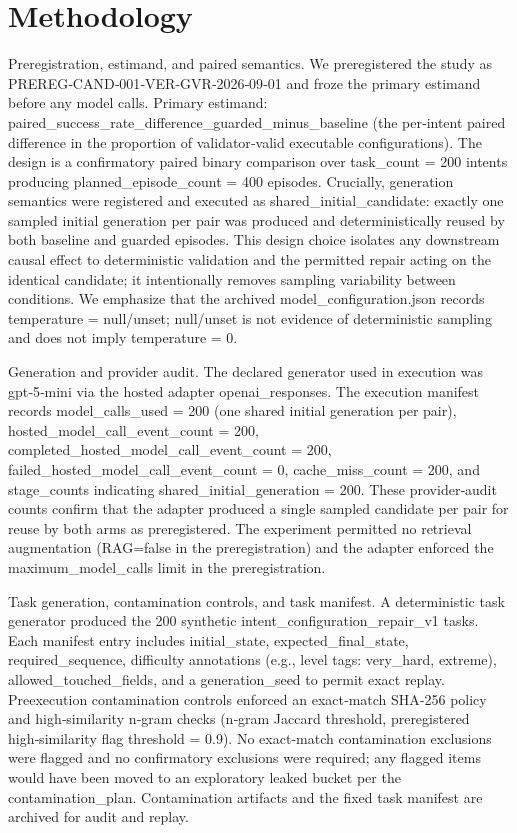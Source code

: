 \documentclass[conference]{IEEEtran}
\begin{document}
\section{Methodology}
Preregistration, estimand, and paired semantics. We preregistered the study as PREREG‑CAND‑001‑VER‑GVR‑2026‑09‑01 and froze the primary estimand before any model calls. Primary estimand: paired\_success\_rate\_difference\_guarded\_minus\_baseline (the per‑intent paired difference in the proportion of validator‑valid executable configurations). The design is a confirmatory paired binary comparison over task\_count = 200 intents producing planned\_episode\_count = 400 episodes. Crucially, generation semantics were registered and executed as shared\_initial\_candidate: exactly one sampled initial generation per pair was produced and deterministically reused by both baseline and guarded episodes. This design choice isolates any downstream causal effect to deterministic validation and the permitted repair acting on the identical candidate; it intentionally removes sampling variability between conditions. We emphasize that the archived model\_configuration.json records temperature = null/unset; null/unset is not evidence of deterministic sampling and does not imply temperature = 0.

Generation and provider audit. The declared generator used in execution was gpt‑5‑mini via the hosted adapter openai\_responses. The execution manifest records model\_calls\_used = 200 (one shared initial generation per pair), hosted\_model\_call\_event\_count = 200, completed\_hosted\_model\_call\_event\_count = 200, failed\_hosted\_model\_call\_event\_count = 0, cache\_miss\_count = 200, and stage\_counts indicating shared\_initial\_generation = 200. These provider‑audit counts confirm that the adapter produced a single sampled candidate per pair for reuse by both arms as preregistered. The experiment permitted no retrieval augmentation (RAG=false in the preregistration) and the adapter enforced the maximum\_model\_calls limit in the preregistration.

Task generation, contamination controls, and task manifest. A deterministic task generator produced the 200 synthetic intent\_configuration\_repair\_v1 tasks. Each manifest entry includes initial\_state, expected\_final\_state, required\_sequence, difficulty annotations (e.g., level tags: very\_hard, extreme), allowed\_touched\_fields, and a generation\_seed to permit exact replay. Preexecution contamination controls enforced an exact‑match SHA‑256 policy and high‑similarity n‑gram checks (n‑gram Jaccard threshold, preregistered high‑similarity flag threshold = 0.9). No exact‑match contamination exclusions were flagged and no confirmatory exclusions were required; any flagged items would have been moved to an exploratory leaked bucket per the contamination\_plan. Contamination artifacts and the fixed task manifest are archived for audit and replay.
\end{document}
